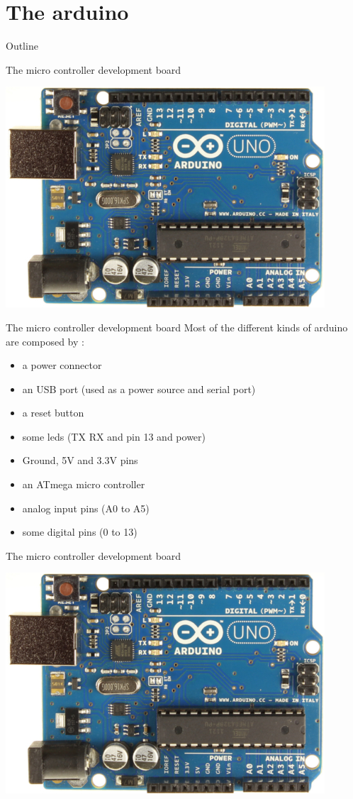 \section {The arduino}
\begin {frame} {Outline}
    \tableofcontents [current]
\end {frame}

\begin {frame} {The micro controller development board}
    \begin {center}
    \includegraphics [width=.7\textwidth,keepaspectratio] {img/arduino}
    \end {center}
\end {frame}

\begin {frame} {The micro controller development board}
	Most of the different kinds of arduino are composed by :
	\begin{itemize}
		\item a power connector
		\pause
		\item an USB port (used as a power source and serial port)
		\pause
		\item a reset button
		\pause
		\item some leds (TX RX and pin 13 and power)
		\pause
		\item Ground, 5V and 3.3V pins
		\pause
		\item an ATmega micro controller
		\pause
		\item analog input pins (A0 to A5)
		\pause
		\item some digital pins (0 to 13)
	\end{itemize}
\end {frame}

\begin {frame} {The micro controller development board}
    \begin {center}
    \includegraphics [width=.9\textwidth,keepaspectratio] {img/arduino}
    \end {center}
\end {frame}

